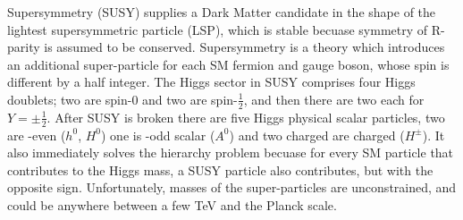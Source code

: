 %











Supersymmetry (SUSY)
supplies a Dark Matter candidate in the shape of the lightest supersymmetric
particle (LSP),
which is stable becuase symmetry of R-parity is assumed to be conserved.
Supersymmetry is a theory which introduces an additional super-particle for each SM fermion and
gauge boson, whose spin is different by a half integer.
The Higgs sector in SUSY comprises four Higgs doublets; two are spin-0 and two are spin-$\tfrac12$,
and then there are two each for $Y=\pm\tfrac12$.
After SUSY is broken there are five Higgs physical scalar particles, two are \CP-even ($h^0$,
$H^0$) one is \CP-odd scalar ($A^0$) and two charged are charged ($H^\pm$).
It also immediately solves the hierarchy problem becuase for every SM particle that contributes to
the Higgs mass, a SUSY particle also contributes, but with the opposite sign.
Unfortunately, masses of the super-particles are unconstrained, and could be anywhere between a few
TeV and the Planck scale.

